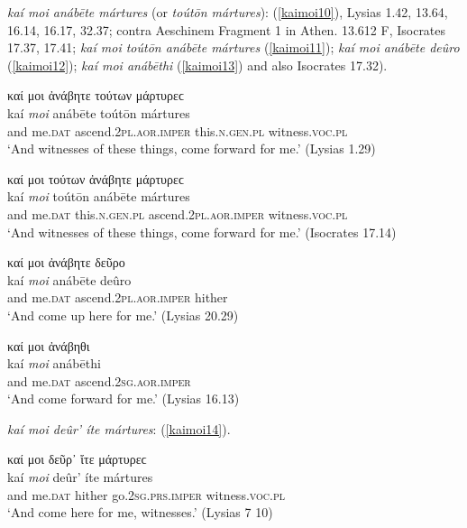 \textit{kaí moi anábēte mártures} (or \textit{toútōn mártures}): (\ref{kaimoi10}), Lysias 1.42, 13.64, 16.14, 16.17, 32.37; contra Aeschinem Fragment 1 \citep[172.26]{BaiterSauppe1850} in Athen. 13.612 F, Isocrates 17.37, 17.41; \textit{kaí moi toútōn anábēte mártures} (\ref{kaimoi11}); \textit{kaí moi anábēte deûro} (\ref{kaimoi12}); \textit{kaí moi anábēthi} (\ref{kaimoi13}) and also Isocrates 17.32).

\begin{exe}
\ex καί μοι ἀνάβητε τούτων μάρτυρεϲ\\
\gll kaí \emph{moi} anábēte toútōn mártures\\
and me.\textsc{dat} ascend.\textsc{2pl.aor.imper}
this.\textsc{n.gen.pl} witness.\textsc{voc.pl}\\
\trans `And witnesses of these things, come forward for me.' (Lysias 1.29)\\\label{kaimoi10}
\end{exe}

\begin{exe}
\ex καί μοι τούτων ἀνάβητε μάρτυρεϲ\\
\gll kaí \emph{moi} toútōn anábēte mártures\\
and me.\textsc{dat} this.\textsc{n.gen.pl}
ascend.\textsc{2pl.aor.imper} witness.\textsc{voc.pl}\\
\trans `And witnesses of these things, come forward for me.' (Isocrates 17.14)
\label{kaimoi11}
\end{exe}

\begin{exe}
\ex καί μοι ἀνάβητε δεῦρο\\
\gll kaí \emph{moi} anábēte deûro\\
and me.\textsc{dat} ascend.\textsc{2pl.aor.imper} hither\\
\trans `And come up here for me.' (Lysias 20.29)
\label{kaimoi12}
\end{exe}

\begin{exe}
\ex καί μοι ἀνάβηθι\\
\gll kaí \emph{moi} anábēthi\\
and me.\textsc{dat} ascend.\textsc{2sg.aor.imper}\\
\trans `And come forward for me.' (Lysias 16.13)
\label{kaimoi13}
\end{exe}

\textit{kaí moi deûr' íte mártures}: (\ref{kaimoi14}).

\begin{exe}
\ex καί μοι δεῦρ᾽ ἴτε μάρτυρεϲ\\
\gll kaí \emph{moi} deûr' íte mártures\\
and me.\textsc{dat} hither go.\textsc{2sg.prs.imper}
witness.\textsc{voc.pl}\\
\trans `And come here for me, witnesses.' (Lysias 7 10)
\label{kaimoi14}
\end{exe}

